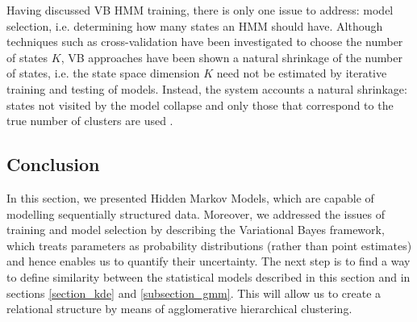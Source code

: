 \documentclass[../main.tex]{subfiles}
\begin{document}
\par Having discussed VB HMM training, there is only one issue to address: model selection, i.e. determining how many states an HMM should have. Although techniques such as cross-validation have been investigated \cite{Siddiqi2007,Rezek2005} to choose the number of states $K$, VB approaches have been shown a natural shrinkage of the number of states, i.e. the state space dimension $K$ need not be estimated by iterative training and testing of models. Instead, the system accounts a natural shrinkage: states not visited by the model collapse and only those that correspond to the true number of clusters are used \cite{Rezek2005}. 

\subsection{Conclusion}
In this section, we presented Hidden Markov Models, which are capable of modelling sequentially structured data. Moreover, we addressed the issues of training and model selection by describing the Variational Bayes framework, which treats parameters as probability distributions (rather than point estimates) and hence enables us to quantify their uncertainty. The next step is to find a way to define similarity between the statistical models described in this section and in sections \ref{section_kde} and \ref{subsection_gmm}. This will allow us to create a relational structure by means of agglomerative hierarchical clustering.
\end{document}
